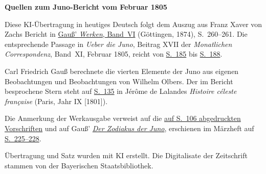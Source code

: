 \clearpage\thispagestyle{empty}
\begin{center}\textbf{Quellen zum Juno-Bericht vom Februar 1805}\end{center}
\noindent Diese KI-Übertragung in heutiges Deutsch folgt dem Auszug aus Franz Xaver von Zachs Bericht in \href{https://gdz.sub.uni-goettingen.de/id/PPN236007467}{Gauß’ \textit{Werken}, Band~VI} (Göttingen, 1874), S.~260--261. Die entsprechende Passage in \textit{Ueber die Juno}, Beitrag XVII der \textit{Monatlichen Correspondenz}, Band~XI, Februar 1805, reicht von \href{https://www.digitale-sammlungen.de/en/view/bsb10538603?page=195}{S.~185} bis \href{https://www.digitale-sammlungen.de/en/view/bsb10538603?page=198}{S.~188}.
\par\smallskip\noindent Carl Friedrich Gauß berechnete die vierten Elemente der Juno aus eigenen Beobachtungen und Beobachtungen von Wilhelm Olbers. Der im Bericht besprochene Stern steht auf \href{https://archive.org/download/histoireclestef00lalagoog/page/n162.jpg}{S.~135} in Jérôme de Lalandes \textit{Histoire céleste française} (Paris, Jahr IX [1801]).
\par\smallskip\noindent Die Anmerkung der Werkausgabe verweist auf die \hyperlink{native-111}{auf S.~106 abgedruckten Vorschriften} und auf Gauß’ \hyperlink{native-124}{\textit{Der Zodiakus der Juno}}, erschienen im Märzheft auf \href{https://www.digitale-sammlungen.de/en/view/bsb10538603?page=237}{S.~225--228}.
\par\smallskip\noindent Übertragung und Satz wurden mit KI erstellt. Die Digitalisate der Zeitschrift stammen von der Bayerischen Staatsbibliothek.
\clearpage
